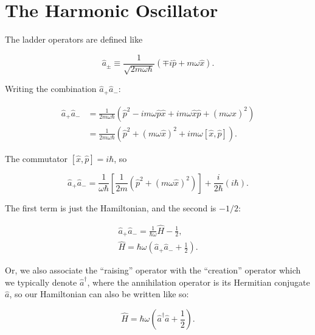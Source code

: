 \section{The Harmonic Oscillator}

\begin{parts}
\item The ladder operators are defined like
  
  \begin{equation}
    \hat{a}_\pm \equiv \frac{1}{\sqrt{2m\omega\hbar}}(\mp i\hat{p} + m\omega\hat{x}).
  \end{equation}

  Writing the combination $\hat{a}_+\hat{a}_-$:

  \begin{align}
    \hat{a}_+\hat{a}_- &= \frac{1}{2m\omega\hbar}\left(\hat{p}^2 - im\omega\hat{p}\hat{x} + im\omega\hat{x}\hat{p} + (m\omega\hat{x})^2\right) \\
                       &= \frac{1}{2m\omega\hbar}\left(\hat{p}^2 + (m\omega\hat{x})^2 + im\omega[\hat{x},\hat{p}]\right).
  \end{align}

  The commutator $[\hat{x},\hat{p}] = i\hbar$, so

  \begin{equation}
    \hat{a}_+\hat{a}_-= \frac{1}{\omega\hbar}\left[\frac{1}{2m}(\hat{p}^2 + (m\omega\hat{x})^2)\right] + \frac{i}{2\hbar}(i\hbar).
  \end{equation}

  The first term is just the Hamiltonian, and the second is $-1/2$:

  \begin{gather}
    \hat{a}_+\hat{a}_- = \frac{1}{\hbar\omega}\hat{H} - \frac{1}{2}, \\
    \boxed{\hat{H} = \hbar\omega\left(\hat{a}_+\hat{a}_- + \frac{1}{2}\right).}
  \end{gather}

  Or, we also associate the ``raising'' operator with the ``creation'' operator which we typically denote $\hat{a}^{\dagger}$, where the annihilation operator is its Hermitian conjugate $\hat{a}$, so our Hamiltonian can also be written like so:

  \begin{equation}
    \boxed{\hat{H} = \hbar\omega\left(\hat{a}^{\dagger}\hat{a} + \frac{1}{2}\right).}
  \end{equation}




\end{parts}
